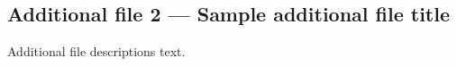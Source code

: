 \subsection*{Additional file 2 --- Sample additional file title}
Additional file descriptions text.
